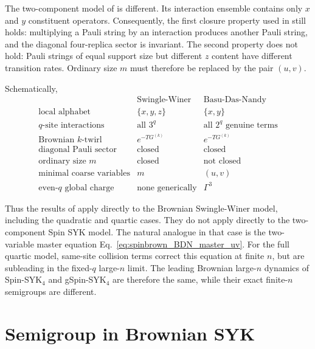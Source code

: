 \documentclass{article}
\theoremstyle{definition}
\begin{document}
The two-component model of \cite{BasuDasNandy2026} is different.  Its
interaction ensemble contains only $x$ and $y$ constituent operators.
Consequently, the first closure property used in \cite{Xu2024} still
holds: multiplying a Pauli string by an interaction produces another
Pauli string, and the diagonal four-replica sector is invariant.  The
second property does not hold: Pauli strings of equal support size but
different $z$ content have different transition rates.  Ordinary size
$m$ must therefore be replaced by the pair $(u,v)$.

Schematically,
\begin{equation}
    \begin{array}{c|c|c}
    & \text{Swingle-Winer} & \text{Basu-Das-Nandy}\\ \hline
    \text{local alphabet}
      & \{x,y,z\}
      & \{x,y\}
      \\[1mm]
    \text{$q$-site interactions}
      & \text{all }3^q
      & \text{all }2^q\text{ genuine terms}
      \\[1mm]
    \text{Brownian $k$-twirl}
      & e^{-TG^{(k)}}
      & e^{-TG^{(k)}}
      \\[1mm]
    \text{diagonal Pauli sector}
      & \text{closed}
      & \text{closed}
      \\[1mm]
    \text{ordinary size $m$}
      & \text{closed}
      & \text{not closed}
      \\[1mm]
    \text{minimal coarse variables}
      & m
      & (u,v)
      \\[1mm]
    \text{even-$q$ global charge}
      & \text{none generically}
      & \Gamma^3
    \end{array}
    \label{eq:spinbrown_comparison_table}
\end{equation}

Thus the results of \cite{Xu2024} apply directly to the Brownian
Swingle-Winer model, including the quadratic and quartic cases.  They do
not apply directly to the two-component Spin SYK model.  The natural
analogue in that case is the two-variable master equation
Eq.~\eqref{eq:spinbrown_BDN_master_uv}.  For the full quartic model,
same-site collision terms correct this equation at finite $n$, but are
subleading in the fixed-$q$ large-$n$ limit.  The leading Brownian
large-$n$ dynamics of Spin-SYK$_4$ and gSpin-SYK$_4$ are therefore the
same, while their exact finite-$n$ semigroups are different.


   \section{Semigroup in Brownian SYK}
\end{document}
